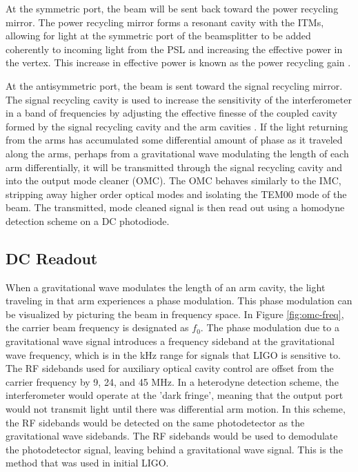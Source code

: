At the symmetric port, the beam 
will be sent back toward the power recycling mirror. The power recycling mirror 
forms a resonant cavity with the ITMs, allowing for light at the symmetric 
port of the beamsplitter to be added coherently to incoming light from the PSL and 
increasing the effective power in the vertex. This increase in effective power 
is known as the power recycling gain \cite{aLIGO}. 

At the antisymmetric port, the beam is sent toward the signal recycling mirror. 
The signal recycling cavity is used to increase the sensitivity of the 
interferometer in a band of frequencies by adjusting the effective finesse 
of the coupled cavity 
formed by the signal recycling cavity and the arm cavities \cite{aLIGO}. 
If the light returning from the arms has accumulated some differential amount of 
phase as it traveled 
along the arms, perhaps from a gravitational wave modulating the length of each 
arm differentially, it will be transmitted through the signal recycling cavity 
and into the output mode cleaner (OMC). The OMC behaves similarly to the IMC, 
stripping away higher order optical modes and isolating the TEM00 mode of the 
beam. The transmitted, mode cleaned signal is then read out using a homodyne 
detection scheme on a DC photodiode.

\subsection{DC Readout}

When a gravitational wave modulates the length of an arm cavity, the light 
traveling in that arm experiences a phase modulation. This phase modulation 
can be visualized by picturing the beam in frequency space. In Figure 
\ref{fig:omc-freq}, the carrier beam frequency is designated as $f_0$. 
The phase modulation due to 
a gravitational wave signal introduces a frequency sideband at the 
gravitational wave frequency, which is in the kHz range for signals that 
LIGO is sensitive to. 
The 
RF sidebands used for auxiliary optical cavity control are offset from the 
carrier frequency by 9, 24, and 45 MHz. 
In a heterodyne detection scheme, the interferometer would operate at the 
'dark fringe', meaning that the output port would not transmit light until 
there was differential arm motion. In this scheme, the RF sidebands would be 
detected on the same photodetector as the gravitational wave sidebands. The 
RF sidebands would be used to demodulate the photodetector signal, leaving 
behind a gravitational wave signal. This is the method that was used in 
initial LIGO.

